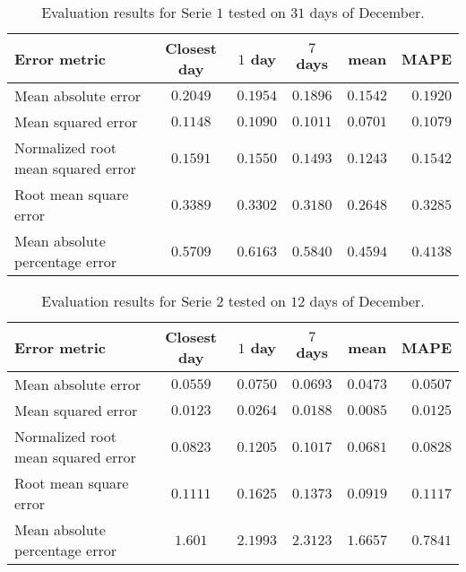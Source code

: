 \begin{table}[ht]
	\centering
	\begin{tabular}{@{}l|ccccr@{}} \toprule
		\textbf{Error metric}	& \textbf{Closest day} & \textbf{$ 1 $ day} & \textbf{$ 7 $ days} & \textbf{mean} & \textbf{MAPE}\\\midrule
		Mean absolute error& \cellcolor{red!25}$0.2049 $&$ 0.1954 $  & $0.1896 $ & \cellcolor{green!25}$ 0.1542 $ & $ 0.1920 $\\
		Mean squared error& \cellcolor{red!25}$0.1148 $&$ 0.1090 $  & $0.1011 $ & \cellcolor{green!25}$ 0.0701 $ & $ 0.1079 $\\
		Normalized root mean squared error& \cellcolor{red!25}$0.1591 $&$ 0.1550$  & $0.1493$ & \cellcolor{green!25}$ 0.1243$ & $ 0.1542$\\
		Root mean square error&\cellcolor{red!25} $0.3389 $&$ 0.3302$  & $0.3180$ & \cellcolor{green!25}$ 0.2648$ & $ 0.3285$\\
		Mean absolute percentage error & $ 0.5709 $&\cellcolor{red!25}$ 0.6163 $  & $ 0.5840 $ & $ 0.4594 $ & \cellcolor{green!25}$ 0.4138 $\\\bottomrule
	\end{tabular}
	\caption{Evaluation results for Serie $ 1 $ tested on $ 31 $ days of December.}
	\label{tab:summ_data_serie1}
\end{table}
\begin{table}[ht]
	\centering
	\begin{tabular}{@{}l|ccccr@{}} \toprule
		\textbf{Error metric}	& \textbf{Closest day} & \textbf{$ 1 $ day} & \textbf{$ 7 $ days} & \textbf{mean} & \textbf{MAPE}\\\midrule
		Mean absolute error& $0.0559 $&\cellcolor{red!25}$ 0.0750 $  & $0.0693 $ & \cellcolor{green!25}$ 0.0473 $ & $ 0.0507 $\\
		Mean squared error& $0.0123 $&\cellcolor{red!25}$ 0.0264 $  & $0.0188 $ & \cellcolor{green!25}$ 0.0085 $ & $ 0.0125 $\\
		Normalized root mean squared error& $0.0823 $&\cellcolor{red!25}$ 0.1205$  & $0.1017$ & \cellcolor{green!25}$ 0.0681$ & $ 0.0828$\\
		Root mean square error& $0.1111 $&$ 0.1625$  &\cellcolor{red!25} $0.1373$ & \cellcolor{green!25}$ 0.0919$ & $ 0.1117$\\
		Mean absolute percentage error & $ 1.601 $&$ 2.1993 $  &\cellcolor{red!25} $ 2.3123 $ & $ 1.6657 $ & \cellcolor{green!25}$ 0.7841 $\\\bottomrule
	\end{tabular}
	\caption{Evaluation results for Serie $ 2 $ tested on $ 12 $ days of December.}
	\label{tab:summ_data_serie2}
\end{table}

